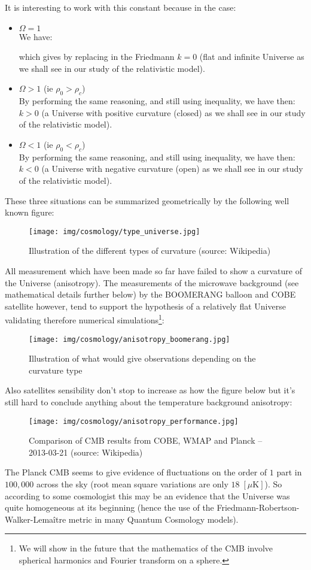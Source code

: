 	It is interesting to work with this constant because in the case:
	\begin{itemize}
		\item $\Omega=1$\\
		We have:
		
		which gives by replacing in the Friedmann $k=0$ (flat and infinite Universe as we shall see in our study of the relativistic model).

		\item $\Omega>1$ (ie $\rho_0>\rho_c$)\\
		By performing the same reasoning, and still using inequality, we have then: $k>0$ (a Universe with positive curvature (closed) as we shall see in our study of the relativistic model).

		\item $\Omega<1$ (ie $\rho_0<\rho_c$)\\
		By performing the same reasoning, and still using inequality, we have then: $k<0$ (a Universe with negative curvature (open) as we shall see in our study of the relativistic model).
	\end{itemize}
	These three situations can be summarized geometrically by the following well known figure:
	\begin{figure}[H]
		\centering
		\texttt{[image: img/cosmology/type\_universe.jpg]}	
		\caption[Illustration of the different types of curvature]{Illustration of the different types of curvature (source: Wikipedia)}
	\end{figure}
	All measurement which have been made so far have failed to show a curvature of the Universe (anisotropy). The measurements of the microwave background (see mathematical details further below) by the BOOMERANG balloon and COBE satellite however, tend to support the hypothesis of a relatively flat Universe validating therefore numerical simulations\footnote{We will show in the future that the mathematics of the CMB involve spherical harmonics and Fourier transform on a sphere.}:
	\begin{figure}[H]
		\centering
		\texttt{[image: img/cosmology/anisotropy\_boomerang.jpg]}	
		\caption{Illustration of what would give observations depending on the curvature type}
	\end{figure}
	Also satellites sensibility don't stop to increase as how the figure below but it's still hard to conclude anything about the temperature background anisotropy:
	\begin{figure}[H]
		\centering
		\texttt{[image: img/cosmology/anisotropy\_performance.jpg]}	
		\caption[Comparison of CMB results from COBE, WMAP and Planck]{Comparison of CMB results from COBE, WMAP and Planck – 2013-03-21 (source: Wikipedia)}
	\end{figure}
	The Planck CMB seems to give evidence of fluctuations on the order of $1$ part in $100,000$ across the sky (root mean square variations are only $18\;[\mu \text{K}]$). So according to some cosmologist this may be an evidence that the Universe was quite homogeneous at its beginning (hence the use of the Friedmann-Robertson-Walker-Lemaître metric in many Quantum Cosmology models).
	
